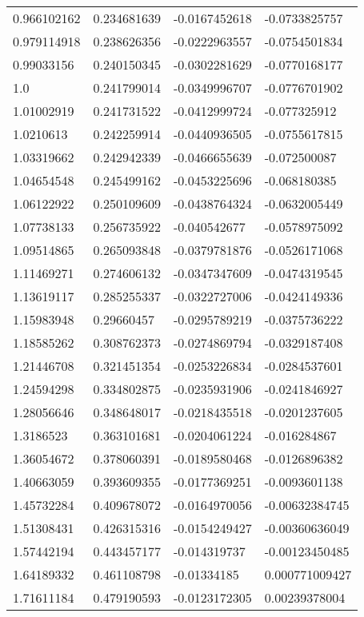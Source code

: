 \begin{longtable}{llll}
	0.966102162 & 0.234681639 & -0.0167452618 & -0.0733825757 \\ 
	0.979114918 & 0.238626356 & -0.0222963557 & -0.0754501834 \\ 
	0.99033156 & 0.240150345 & -0.0302281629 & -0.0770168177 \\ 
	1.0 & 0.241799014 & -0.0349996707 & -0.0776701902 \\ 
	1.01002919 & 0.241731522 & -0.0412999724 & -0.077325912 \\ 
	1.0210613 & 0.242259914 & -0.0440936505 & -0.0755617815 \\ 
	1.03319662 & 0.242942339 & -0.0466655639 & -0.072500087 \\ 
	1.04654548 & 0.245499162 & -0.0453225696 & -0.068180385 \\ 
	1.06122922 & 0.250109609 & -0.0438764324 & -0.0632005449 \\ 
	1.07738133 & 0.256735922 & -0.040542677 & -0.0578975092 \\ 
	1.09514865 & 0.265093848 & -0.0379781876 & -0.0526171068 \\ 
	1.11469271 & 0.274606132 & -0.0347347609 & -0.0474319545 \\ 
	1.13619117 & 0.285255337 & -0.0322727006 & -0.0424149336 \\ 
	1.15983948 & 0.29660457 & -0.0295789219 & -0.0375736222 \\ 
	1.18585262 & 0.308762373 & -0.0274869794 & -0.0329187408 \\ 
	1.21446708 & 0.321451354 & -0.0253226834 & -0.0284537601 \\ 
	1.24594298 & 0.334802875 & -0.0235931906 & -0.0241846927 \\ 
	1.28056646 & 0.348648017 & -0.0218435518 & -0.0201237605 \\ 
	1.3186523 & 0.363101681 & -0.0204061224 & -0.016284867 \\ 
	1.36054672 & 0.378060391 & -0.0189580468 & -0.0126896382 \\ 
	1.40663059 & 0.393609355 & -0.0177369251 & -0.0093601138 \\ 
	1.45732284 & 0.409678072 & -0.0164970056 & -0.00632384745 \\ 
	1.51308431 & 0.426315316 & -0.0154249427 & -0.00360636049 \\ 
	1.57442194 & 0.443457177 & -0.014319737 & -0.00123450485 \\ 
	1.64189332 & 0.461108798 & -0.01334185 & 0.000771009427 \\ 
	1.71611184 & 0.479190593 & -0.0123172305 & 0.00239378004 \\ 

\end{longtable}
